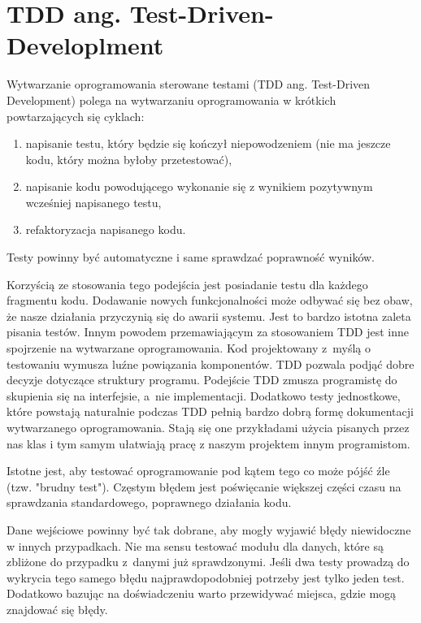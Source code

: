 \section{TDD ang. Test-Driven-Developlment}

Wytwarzanie oprogramowania sterowane testami (TDD ang. Test-Driven Development) polega na wytwarzaniu oprogramowania w krótkich powtarzających się cyklach:

\begin{mybox}
	\begin{enumerate}
		\item napisanie testu, który będzie się kończył niepowodzeniem (nie ma jeszcze kodu, który można byłoby przetestować),
		\item napisanie kodu powodującego wykonanie się z wynikiem pozytywnym wcześniej napisanego testu,
		\item refaktoryzacja napisanego kodu.
	\end{enumerate}
\end{mybox}
Testy powinny być automatyczne i same sprawdzać poprawność wyników.

Korzyścią ze stosowania tego podejścia jest posiadanie testu dla każdego fragmentu kodu. Dodawanie nowych funkcjonalności może odbywać się bez obaw, że nasze działania przyczynią się do awarii systemu. Jest to bardzo istotna zaleta pisania testów. Innym powodem przemawiającym za stosowaniem TDD jest inne spojrzenie na wytwarzane oprogramowania. Kod projektowany z~myślą o testowaniu wymusza luźne powiązania komponentów. TDD pozwala podjąć dobre decyzje dotyczące struktury programu. Podejście TDD zmusza programistę do skupienia się na interfejsie, a~nie implementacji. Dodatkowo testy jednostkowe, które powstają naturalnie podczas TDD pełnią bardzo dobrą formę dokumentacji wytwarzanego oprogramowania. Stają się one przykładami użycia pisanych przez nas klas i tym samym ułatwiają pracę z naszym projektem innym programistom.

Istotne jest, aby testować oprogramowanie pod kątem tego co może pójść źle (tzw. "brudny test"). Częstym błędem jest poświęcanie większej części czasu na sprawdzania standardowego, poprawnego działania kodu. 

Dane wejściowe powinny być tak dobrane, aby mogły wyjawić błędy niewidoczne w innych przypadkach. Nie ma sensu testować modułu dla danych, które są zbliżone do przypadku z~danymi już sprawdzonymi. Jeśli dwa testy prowadzą do wykrycia tego samego błędu najprawdopodobniej potrzeby jest tylko jeden test. Dodatkowo bazując na doświadczeniu warto przewidywać miejsca, gdzie mogą znajdować się błędy. 

